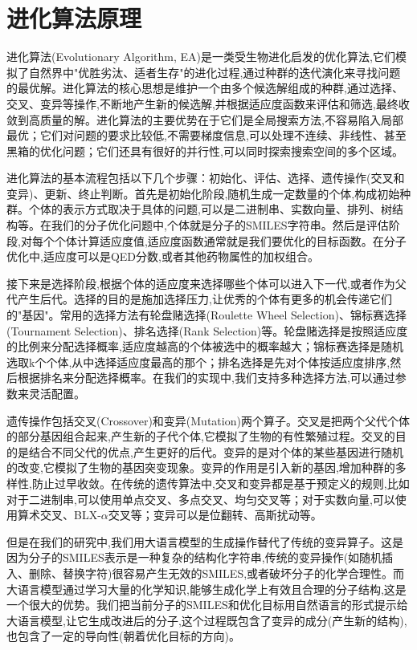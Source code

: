 \section{进化算法原理}

进化算法(Evolutionary Algorithm, EA)是一类受生物进化启发的优化算法,它们模拟了自然界中"优胜劣汰、适者生存"的进化过程,通过种群的迭代演化来寻找问题的最优解。进化算法的核心思想是维护一个由多个候选解组成的种群,通过选择、交叉、变异等操作,不断地产生新的候选解,并根据适应度函数来评估和筛选,最终收敛到高质量的解。进化算法的主要优势在于它们是全局搜索方法,不容易陷入局部最优；它们对问题的要求比较低,不需要梯度信息,可以处理不连续、非线性、甚至黑箱的优化问题；它们还具有很好的并行性,可以同时探索搜索空间的多个区域。

进化算法的基本流程包括以下几个步骤：初始化、评估、选择、遗传操作(交叉和变异)、更新、终止判断。首先是初始化阶段,随机生成一定数量的个体,构成初始种群。个体的表示方式取决于具体的问题,可以是二进制串、实数向量、排列、树结构等。在我们的分子优化问题中,个体就是分子的SMILES字符串。然后是评估阶段,对每个个体计算适应度值,适应度函数通常就是我们要优化的目标函数。在分子优化中,适应度可以是QED分数,或者其他药物属性的加权组合。

接下来是选择阶段,根据个体的适应度来选择哪些个体可以进入下一代,或者作为父代产生后代。选择的目的是施加选择压力,让优秀的个体有更多的机会传递它们的"基因"。常用的选择方法有轮盘赌选择(Roulette Wheel Selection)、锦标赛选择(Tournament Selection)、排名选择(Rank Selection)等。轮盘赌选择是按照适应度的比例来分配选择概率,适应度越高的个体被选中的概率越大；锦标赛选择是随机选取k个个体,从中选择适应度最高的那个；排名选择是先对个体按适应度排序,然后根据排名来分配选择概率。在我们的实现中,我们支持多种选择方法,可以通过参数来灵活配置。

遗传操作包括交叉(Crossover)和变异(Mutation)两个算子。交叉是把两个父代个体的部分基因组合起来,产生新的子代个体,它模拟了生物的有性繁殖过程。交叉的目的是结合不同父代的优点,产生更好的后代。变异的是对个体的某些基因进行随机的改变,它模拟了生物的基因突变现象。变异的作用是引入新的基因,增加种群的多样性,防止过早收敛。在传统的遗传算法中,交叉和变异都是基于预定义的规则,比如对于二进制串,可以使用单点交叉、多点交叉、均匀交叉等；对于实数向量,可以使用算术交叉、BLX-$\alpha$交叉等；变异可以是位翻转、高斯扰动等。

但是在我们的研究中,我们用大语言模型的生成操作替代了传统的变异算子。这是因为分子的SMILES表示是一种复杂的结构化字符串,传统的变异操作(如随机插入、删除、替换字符)很容易产生无效的SMILES,或者破坏分子的化学合理性。而大语言模型通过学习大量的化学知识,能够生成化学上有效且合理的分子结构,这是一个很大的优势。我们把当前分子的SMILES和优化目标用自然语言的形式提示给大语言模型,让它生成改进后的分子,这个过程既包含了变异的成分(产生新的结构),也包含了一定的导向性(朝着优化目标的方向)。

